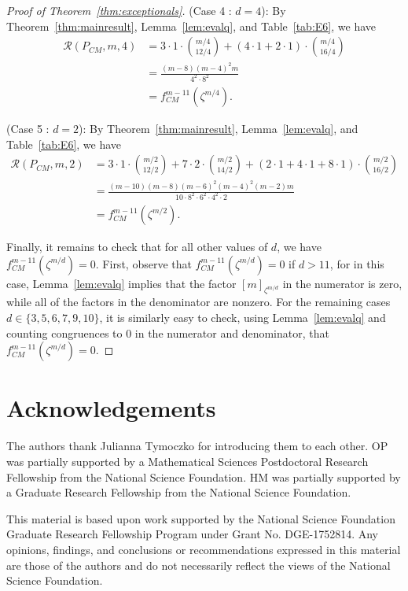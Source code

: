 \documentclass[12pt]{amsart}
\theoremstyle{definition}
\theoremstyle{remark}
\numberwithin{equation}{section}
\begin{document}
\begin{proof}[Proof of Theorem~\ref{thm:exceptionals}]
\smallskip
\noindent
{\sf (Case 4 : $d = 4$)}:
By Theorem~\ref{thm:mainresult}, Lemma~\ref{lem:evalq}, and Table~\ref{tab:E6}, we have
\begin{align*}
\mathcal{R}(P_{CM},m,4) &= 3 \cdot 1 \cdot \binom{m/4}{12/4} + (4 \cdot 1 + 2 \cdot 1) \cdot \binom{m/4}{16/4}  \\
&= \frac{(m-8)(m-4)^2m}{4^2 \cdot 8^2} \\
&= f_{CM}^{m-11}(\zeta^{m/4}).
\end{align*}

\smallskip
\noindent
{\sf (Case 5 : $d = 2$)}:
By Theorem~\ref{thm:mainresult}, Lemma~\ref{lem:evalq}, and Table~\ref{tab:E6}, we have
\begin{align*}
\mathcal{R}(P_{CM},m,2) &= 3 \cdot 1 \cdot \binom{m/2}{12/2} + 7 \cdot 2 \cdot \binom{m/2}{14/2} + (2 \cdot 1 + 4 \cdot 1 + 8 \cdot 1) \cdot \binom{m/2}{16/2} \\
&= \frac{(m-10)(m-8)(m-6)^2(m-4)^2(m-2)m}{10 \cdot 8^2 \cdot 6^2 \cdot  4^2 \cdot 2}\\
&= f_{CM}^{m-11}(\zeta^{m/2}).
\end{align*}

Finally, it remains to check that for all other values of $d$, we have $f^{m-11}_{CM}(\zeta^{m/d}) = 0$.  First, observe that $f^{m-11}_{CM}(\zeta^{m/d}) = 0$ if $d > 11$, for in this case, Lemma~\ref{lem:evalq} implies that the factor $[m]_{\zeta^{m/d}}$ in the numerator is zero, while all of the factors in the denominator are nonzero. 
For the remaining cases $d \in \{3,5,6,7,9,10 \}$, it is similarly easy to check, using Lemma~\ref{lem:evalq} and counting congruences to $0$ in the numerator and denominator, that $f^{m-11}_{CM}(\zeta^{m/d}) = 0$. 
\end{proof}

\section*{Acknowledgements}
The authors thank Julianna Tymoczko for introducing them to each other. OP was partially supported by a Mathematical Sciences Postdoctoral Research Fellowship from the National Science Foundation. HM was partially supported by a Graduate Research Fellowship from the National Science Foundation.

This material is based upon work supported by the National Science Foundation Graduate Research Fellowship Program under Grant No. DGE-1752814. Any opinions, findings, and conclusions or recommendations expressed in this material are those of the authors and do not necessarily reflect the views of the National Science Foundation.


%
%


 

\end{document}
